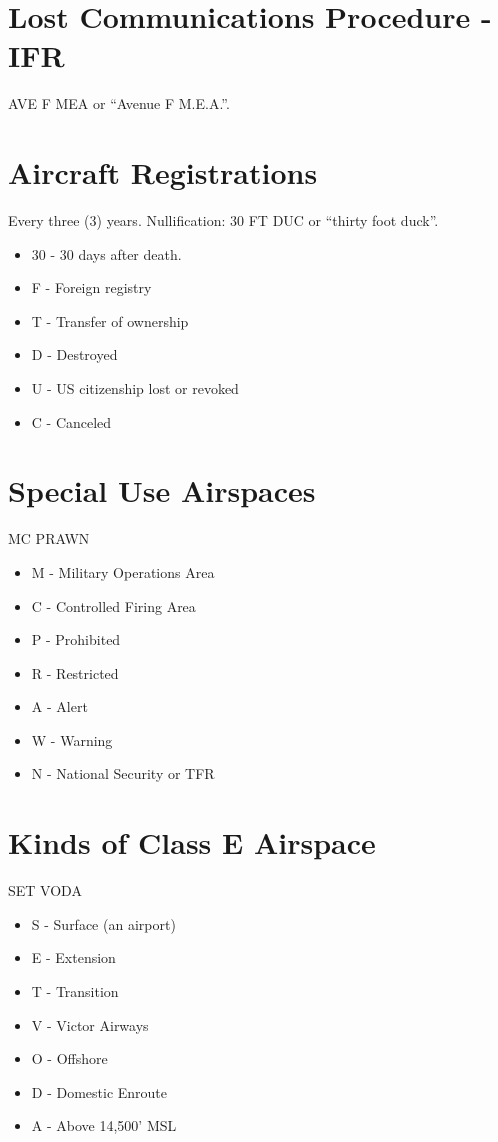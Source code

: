 \section{Lost Communications Procedure - IFR}

AVE F MEA or ``Avenue F M.E.A.''.

\section{Aircraft Registrations}

Every three (3) years. Nullification: 30 FT DUC or ``thirty foot duck''.

\begin{itemize}
\item 30 - 30 days after death.
\item F - Foreign registry
\item T - Transfer of ownership
\item D - Destroyed
\item U - US citizenship lost or revoked
\item C - Canceled
\end{itemize}

\section{Special Use Airspaces}

MC PRAWN

\begin{itemize}
    \item M - Military Operations Area
    \item C - Controlled Firing Area
    \item P - Prohibited
    \item R - Restricted
    \item A - Alert
    \item W - Warning
    \item N - National Security or TFR
\end{itemize}

\section{Kinds of Class E Airspace}

SET VODA

\begin{itemize}
    \item S - Surface (an airport)
    \item E - Extension
    \item T - Transition
    \item V - Victor Airways
    \item O - Offshore
    \item D - Domestic Enroute
    \item A - Above 14,500' MSL
\end{itemize}

